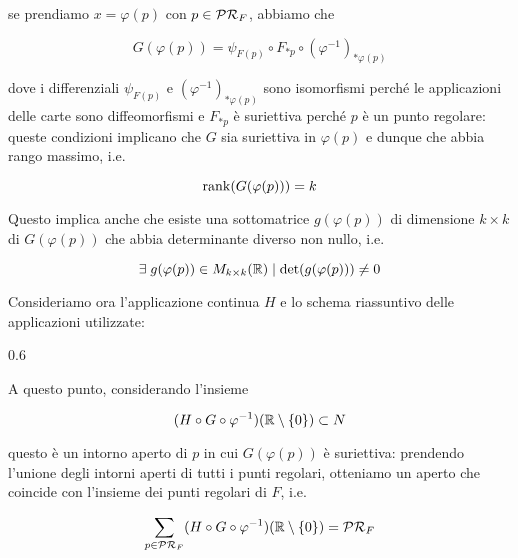 {se prendiamo $ x = \varphi(p) $ con $ p \in \mathcal{PR}_{F} $, abbiamo che

\begin{equation}
	G(\varphi(p)) = \psi_{F(p)} \circ F_{*p} \circ (\varphi^{-1})_{*\varphi(p)}
\end{equation}

dove i differenziali $ \psi_{F(p)} $ e $ (\varphi^{-1})_{*\varphi(p)} $ sono isomorfismi perché le applicazioni delle carte sono diffeomorfismi e $ F_{*p} $ è suriettiva perché $ p $ è un punto regolare: queste condizioni implicano che $ G $ sia suriettiva in $ \varphi(p) $ e dunque che abbia rango massimo, i.e.

\begin{equation}
	\rank(G(\varphi(p))) = k
\end{equation}

Questo implica anche che esiste una sottomatrice $ g(\varphi(p)) $ di dimensione $ k \times k $ di $ G(\varphi(p)) $ che abbia determinante diverso non nullo, i.e.

\begin{equation}
	\exists \; g(\varphi(p)) \in M_{k \times k}(\mathbb{R}) \mid \det(g(\varphi(p))) \neq 0
\end{equation}

Consideriamo ora l'applicazione continua $ H $ e lo schema riassuntivo delle applicazioni utilizzate:

	{0.6}{%
			}

A questo punto, considerando l'insieme

\begin{equation}
	(H \circ G \circ \varphi^{-1}) (\mathbb{R} \setminus \{0\}) \subset N
\end{equation}

questo è un intorno aperto di $ p $ in cui $ G(\varphi(p)) $ è suriettiva: prendendo l'unione degli intorni aperti di tutti i punti regolari, otteniamo un aperto che coincide con l'insieme dei punti regolari di $ F $, i.e.

\begin{equation}
	\sum_{p \in \mathcal{PR}_{F}} (H \circ G \circ \varphi^{-1}) (\mathbb{R} \setminus \{0\}) = \mathcal{PR}_{F}
\end{equation}
}


